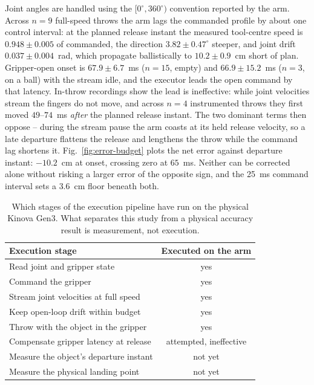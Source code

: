 \documentclass[letterpaper, 10 pt, conference]{ieeeconf}
\begin{document}
Joint angles are handled using the $[0^\circ,360^\circ)$ convention reported by
the arm. Across $n=9$ full-speed throws the arm lags the commanded profile by about one
control interval: at the planned release instant the measured tool-centre speed
is $0.948\pm0.005$ of commanded, the direction $3.82\pm0.47^\circ$ steeper, and
joint drift $0.037\pm0.004$~rad, which propagate ballistically to
$10.2\pm0.9$~cm short of plan. Gripper-open onset is $67.9\pm6.7$~ms ($n=15$,
empty) and $66.9\pm15.2$~ms ($n=3$, on a ball) with the stream idle, and the
executor leads the open command by that latency. In-throw recordings show the
lead is ineffective: while joint velocities stream the fingers do not move, and
across $n=4$ instrumented throws they first moved $49$--$74$~ms \emph{after} the
planned release instant. The two dominant terms then oppose -- during the stream
pause the arm coasts at its held release velocity, so a late departure flattens
the release and lengthens the throw while the command lag shortens it.
Fig.~\ref{fig:error-budget} plots the net error against departure instant:
$-10.2$~cm at onset, crossing zero at $65$~ms. Neither can be corrected alone
without risking a larger error of the opposite sign, and the 25~ms command
interval sets a $3.6$~cm floor beneath both.

\begin{table}[t]
\centering
\small
\caption{Which stages of the execution pipeline have run on the physical Kinova Gen3. What separates this study from a physical accuracy result is measurement, not execution.}
\label{tab:hw-status}
\begin{tabular}{@{}p{4.9cm}c@{}}
\toprule
Execution stage & Executed on the arm \\
\midrule
Read joint and gripper state & yes \\
Command the gripper & yes \\
Stream joint velocities at full speed & yes \\
Keep open-loop drift within budget & yes \\
Throw with the object in the gripper & yes \\
Compensate gripper latency at release & attempted, ineffective \\
Measure the object's departure instant & not yet \\
Measure the physical landing point & not yet \\
\bottomrule
\end{tabular}
\end{table}
\end{document}
